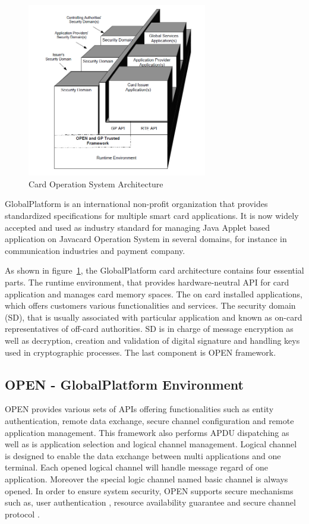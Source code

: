 \begin{figure}[!htbp]
	\centering
	\includegraphics[width=0.7\textwidth]{gp_1.jpg}
		\caption{Card Operation System Architecture\cite{gp}}
	\label{fig:gp_1}
\end{figure}
GlobalPlatform is an international non-profit organization that provides standardized specifications for multiple smart card applications. It is now widely accepted and used as industry standard for managing Java Applet based application on Javacard Operation System in several domains, for instance in communication industries and payment company\cite{gp}. 

As shown in figure~\ref{fig:gp_1},  the GlobalPlatform card architecture contains four essential parts. The runtime environment, that provides hardware-neutral API for card application  and manages card memory spaces. The on card installed applications, which offers customers various functionalities and services. The security domain (SD), that is usually associated with particular application and known as on-card representatives  of off-card  authorities. SD is in charge of message encryption as well as decryption, creation and validation of digital signature and handling keys used in cryptographic processes. The last component is OPEN framework\cite{gp}.

\subsection{OPEN - GlobalPlatform Environment}
OPEN provides various sets of APIs offering functionalities such as entity authentication, remote data exchange, secure channel configuration and remote application management. This framework also performs APDU dispatching as well as is application selection and logical channel management\cite{gp}. Logical channel is designed to enable the data exchange between multi applications and one terminal. Each opened logical channel will handle message regard of one application.  Moreover the special logic channel named basic channel is always opened. In order to ensure system security, OPEN supports secure mechanisms such as,  user authentication , resource availability guarantee and secure channel protocol .
